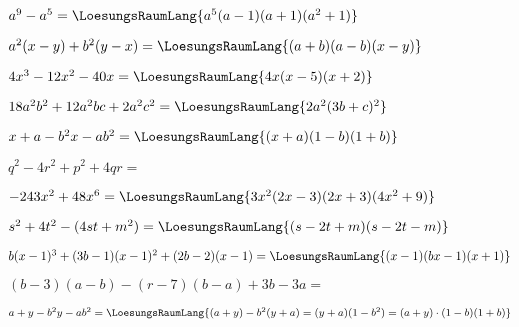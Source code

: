 \begin{bbwAufgabenBlock}
\item $a^9-a^5 = \LoesungsRaumLang{a^5(a-1)(a+1)(a^2+1)}$
\item $a^2(x-y) + b^2(y-x) =\LoesungsRaumLang{(a+b)(a-b)(x-y)}$
\item $4x^3-12x^2-40x = \LoesungsRaumLang{4x(x-5)(x+2)}$
\item $18a^2b^2+12a^2bc + 2a^2c^2 = \LoesungsRaumLang{2a^2(3b+c)^2}$\noTRAINER{\newpage}
\item $x+a-b^2x-ab^2 = \LoesungsRaumLang{(x+a)(1-b)(1+b)}$
\item $q^2-4r^2+p^2 + 4qr = $
\item $-243x^2 + 48x^6 = \LoesungsRaumLang{3x^2(2x-3)(2x+3)(4x^2+9)}$
\item $s^2+4t^2-(4st+m^2) = \LoesungsRaumLang{(s-2t+m)(s-2t-m)}$\noTRAINER{\newpage}
\item $b(x-1)^3 + (3b-1)(x-1)^2 + (2b-2)(x-1) = \LoesungsRaumLang{(x-1)(bx-1)(x+1)}$
\item $(b-3)(a-b)-(r-7)(b-a)+3b-3a =$\\
\item $a+y-b^2y-ab^2 = \LoesungsRaumLang{(a+y)-b^2(y+a) = (y+a)(1-b^2) = (a+y)\cdot{}(1-b)(1+b)}$
\end{bbwAufgabenBlock}





